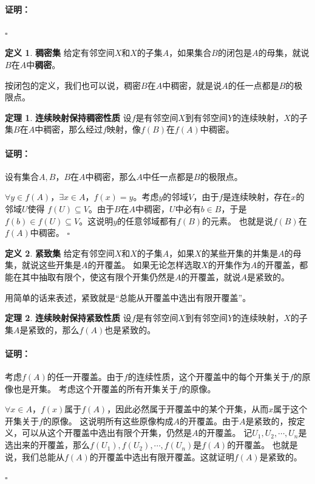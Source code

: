 \documentclass[12pt,UTF8]{ctexbook}
\theoremstyle{definition}
\newtheorem{df}{定义}[section]
\newtheorem{tm}{定理}[section]
\theoremstyle{plain}
\renewenvironment{proof}{\paragraph{\textbf{证明：}}}{\hfill$\square$}
\begin{document}
\begin{appendix}
\begin{proof}
\end{proof}

\begin{df}{\textbf{稠密集}}
    给定有邻空间$X$和$X$的子集$A$，如果集合$B$的闭包是$A$的母集，就说$B$在$A$中\textbf{稠密}。
\end{df}

按闭包的定义，我们也可以说，稠密$B$在$A$中稠密，就是说$A$的任一点都是$B$的极限点。

\begin{tm}{\textbf{连续映射保持稠密性质}}
    设$f$是有邻空间$X$到有邻空间$Y$的连续映射，$X$的子集$B$在$A$中稠密，那么经过$f$映射，像$f(B)$在$f(A)$中稠密。
\end{tm}

\begin{proof}
    设有集合$A,B$，$B$在$A$中稠密，那么$A$中任一点都是$B$的极限点。

    $\forall y\in f(A)$，$\exists x\in A$，$f(x) = y$。考虑$y$的邻域$V$，由于$f$是连续映射，存在$x$的邻域$U$使得
    $f(U)\subseteq V$。由于$B$在$A$中稠密，$U$中必有$b\in B$，于是$f(b)\in f(U) \subseteq V$。这说明$y$的任意邻域都有$f(B)$的元素。
    也就是说$f(B)$在$f(A)$中稠密。
\end{proof}

\begin{df}{\textbf{紧致集}}
    给定有邻空间$X$和$X$的子集$A$，如果$X$的某些开集的并集是$A$的母集，就说这些开集是$A$的开覆盖。
    如果无论怎样选取$X$的开集作为$A$的开覆盖，都能在其中抽取有限个，使这有限个开集仍然是$A$的开覆盖，就说$A$是紧致的。
\end{df}

用简单的话来表述，紧致就是“总能从开覆盖中选出有限开覆盖”。

\begin{tm}{\textbf{连续映射保持紧致性质}}
    设$f$是有邻空间$X$到有邻空间$Y$的连续映射，$X$的子集$A$是紧致的，那么$f(A)$也是紧致的。
\end{tm}

\begin{proof}
    考虑$f(A)$的任一开覆盖。由于$f$的连续性质，这个开覆盖中的每个开集关于$f$的原像也是开集。
    考虑这个开覆盖的所有开集关于$f$的原像。

    $\forall x\in A$，$f(x)$属于$f(A)$，因此必然属于开覆盖中的某个开集，从而$x$属于这个开集关于$f$的原像。
    这说明所有这些原像构成$A$的开覆盖。由于$A$是紧致的，按定义，可以从这个开覆盖中选出有限个开集，仍然是$A$的开覆盖。
    记$U_1, U_2, \cdots, U_n$是选出来的开覆盖，那么$f(U_1), f(U_2), \cdots , f(U_n)$是$f(A)$的开覆盖。
    也就是说，我们总能从$f(A)$的开覆盖中选出有限开覆盖。这就证明$f(A)$是紧致的。


\end{proof}
\end{appendix}
\end{document}
